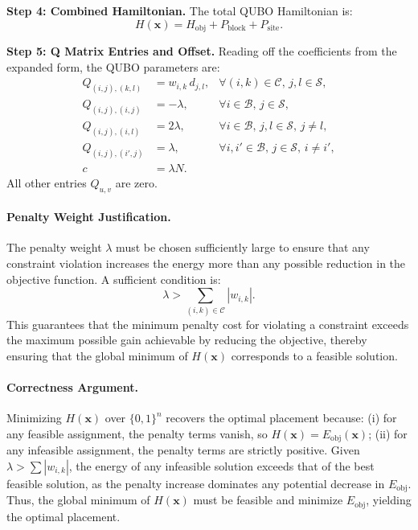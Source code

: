 \documentclass[12pt]{article}
\begin{document}
\textbf{Step 4: Combined Hamiltonian.}
The total QUBO Hamiltonian is:
\begin{equation}
    H(\mathbf{x}) = H_{\text{obj}} + P_{\text{block}} + P_{\text{site}}.
\end{equation}

\textbf{Step 5: Q Matrix Entries and Offset.}
Reading off the coefficients from the expanded form, the QUBO parameters are:
\begin{align}
    Q_{(i,j),(k,l)} &= w_{i,k} \, d_{j,l}, & \forall (i,k) \in \mathcal{C}, \, j,l \in \mathcal{S}, \\
    Q_{(i,j),(i,j)} &= -\lambda, & \forall i \in \mathcal{B}, \, j \in \mathcal{S}, \\
    Q_{(i,j),(i,l)} &= 2\lambda, & \forall i \in \mathcal{B}, \, j,l \in \mathcal{S}, \, j \neq l, \\
    Q_{(i,j),(i',j)} &= \lambda, & \forall i,i' \in \mathcal{B}, \, j \in \mathcal{S}, \, i \neq i', \\
    c &= \lambda N.
\end{align}
All other entries $Q_{u,v}$ are zero.

\paragraph{Penalty Weight Justification.}
The penalty weight $\lambda$ must be chosen sufficiently large to ensure that any constraint violation increases the energy more than any possible reduction in the objective function. A sufficient condition is:
\begin{equation}
    \lambda > \sum_{(i,k) \in \mathcal{C}} |w_{i,k}|.
\end{equation}
This guarantees that the minimum penalty cost for violating a constraint exceeds the maximum possible gain achievable by reducing the objective, thereby ensuring that the global minimum of $H(\mathbf{x})$ corresponds to a feasible solution.

\paragraph{Correctness Argument.}
Minimizing $H(\mathbf{x})$ over $\{0,1\}^n$ recovers the optimal placement because: (i) for any feasible assignment, the penalty terms vanish, so $H(\mathbf{x}) = E_{\text{obj}}(\mathbf{x})$; (ii) for any infeasible assignment, the penalty terms are strictly positive. Given $\lambda > \sum |w_{i,k}|$, the energy of any infeasible solution exceeds that of the best feasible solution, as the penalty increase dominates any potential decrease in $E_{\text{obj}}$. Thus, the global minimum of $H(\mathbf{x})$ must be feasible and minimize $E_{\text{obj}}$, yielding the optimal placement.
\end{document}
